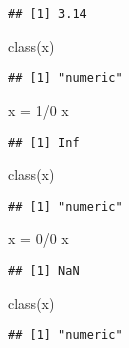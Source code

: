 \documentclass[
]{book}
\newenvironment{Shaded}{\begin{snugshade}}{\end{snugshade}}
\newcommand{\DecValTok}[1]{\textcolor[rgb]{0.00,0.00,0.81}{#1}}
\newcommand{\FunctionTok}[1]{\textcolor[rgb]{0.00,0.00,0.00}{#1}}
\newcommand{\NormalTok}[1]{#1}
\newcommand{\OtherTok}[1]{\textcolor[rgb]{0.56,0.35,0.01}{#1}}
\newcommand{\SpecialCharTok}[1]{\textcolor[rgb]{0.00,0.00,0.00}{#1}}
\begin{document}
\begin{verbatim}
## [1] 3.14
\end{verbatim}

\begin{Shaded}
\begin{Highlighting}[]
\FunctionTok{class}\NormalTok{(x)}
\end{Highlighting}
\end{Shaded}

\begin{verbatim}
## [1] "numeric"
\end{verbatim}

\begin{Shaded}
\begin{Highlighting}[]
\NormalTok{x }\OtherTok{=} \DecValTok{1}\SpecialCharTok{/}\DecValTok{0}
\NormalTok{x}
\end{Highlighting}
\end{Shaded}

\begin{verbatim}
## [1] Inf
\end{verbatim}

\begin{Shaded}
\begin{Highlighting}[]
\FunctionTok{class}\NormalTok{(x)}
\end{Highlighting}
\end{Shaded}

\begin{verbatim}
## [1] "numeric"
\end{verbatim}

\begin{Shaded}
\begin{Highlighting}[]
\NormalTok{x }\OtherTok{=} \DecValTok{0}\SpecialCharTok{/}\DecValTok{0}
\NormalTok{x}
\end{Highlighting}
\end{Shaded}

\begin{verbatim}
## [1] NaN
\end{verbatim}

\begin{Shaded}
\begin{Highlighting}[]
\FunctionTok{class}\NormalTok{(x)}
\end{Highlighting}
\end{Shaded}

\begin{verbatim}
## [1] "numeric"
\end{verbatim}
\end{document}
